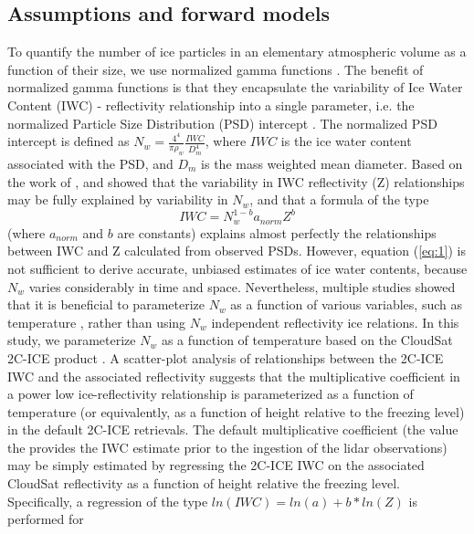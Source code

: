\documentclass{ametsocV6.1}
\begin{document}
\subsection{Assumptions and forward models}
To quantify the number of ice particles in an elementary atmospheric volume as a function of their size, we use
normalized gamma functions \citep{bringi2003}.  The benefit of normalized gamma functions is that they 
encapsulate the variability of Ice Water Content (IWC) - reflectivity relationship into a single parameter,
i.e. the 
normalized Particle Size Distribution (PSD) intercept \citep{testud2001,bringi2003}. The normalized
PSD intercept is defined as $N_w=\frac {4^4} {\pi \rho_w} \frac {IWC} {D_m^4}$, where $IWC$ is the ice water 
content associated with the PSD, and $D_m$ is the mass weighted mean diameter.  Based on the work of \cite{testud2001},
\cite{ferreira2001} and \cite{delanoe2014} showed 
that the variability in IWC reflectivity (Z) relationships may be fully explained by variability in $N_w$, and 
that a formula of the type
\begin{equation}
IWC=N_w^{1-b}a_{norm} Z^b \label{eq:1}
\end{equation}
(where $a_{norm}$ and $b$ are constants) explains almost perfectly the relationships between IWC and Z calculated from observed PSDs.
However, equation (\ref{eq:1}) is not 
sufficient to derive accurate, unbiased estimates of ice water contents, because $N_w$ varies considerably in 
time and space. Nevertheless, multiple studies showed that it is beneficial to parameterize $N_w$ as a function 
of various variables, such as temperature \citep{hogan2006retrieval, delanoe2008variational,deng2010tropical}, 
rather than using $N_w$ independent reflectivity ice relations.  In this study, we parameterize
$N_w$ as a function of temperature based on the CloudSat 2C-ICE product \citep{deng2010tropical,deng2013evaluation}.  
A scatter-plot analysis of relationships between the 2C-ICE IWC and the associated reflectivity suggests that
the multiplicative coefficient in a power low ice-reflectivity relationship is parameterized as a function of temperature 
(or equivalently, as a function of height relative to the freezing level) in 
the default 2C-ICE retrievals. The default multiplicative coefficient (the value the provides the IWC estimate prior
to the ingestion of the lidar observations) may be simply estimated by regressing the 2C-ICE IWC on the associated CloudSat reflectivity 
as a function of height relative the freezing level. Specifically, a regression of the type $ln(IWC)=ln(a)+b*ln(Z)$ is performed for 
\end{document}
